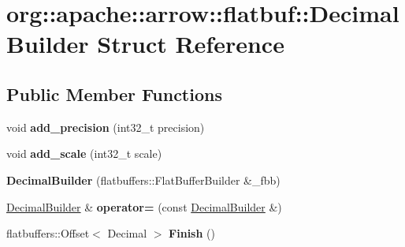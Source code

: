\hypertarget{structorg_1_1apache_1_1arrow_1_1flatbuf_1_1DecimalBuilder}{}\section{org\+:\+:apache\+:\+:arrow\+:\+:flatbuf\+:\+:Decimal\+Builder Struct Reference}
\label{structorg_1_1apache_1_1arrow_1_1flatbuf_1_1DecimalBuilder}
\subsection*{Public Member Functions}
\begin{DoxyCompactItemize}
\item 
void {\bfseries add\+\_\+precision} (int32\+\_\+t precision)\hypertarget{structorg_1_1apache_1_1arrow_1_1flatbuf_1_1DecimalBuilder_ad18a998f2ad83ed23802986b1494d75b}{}\label{structorg_1_1apache_1_1arrow_1_1flatbuf_1_1DecimalBuilder_ad18a998f2ad83ed23802986b1494d75b}

\item 
void {\bfseries add\+\_\+scale} (int32\+\_\+t scale)\hypertarget{structorg_1_1apache_1_1arrow_1_1flatbuf_1_1DecimalBuilder_a7313ee1fe8676a7566858379f7ffdded}{}\label{structorg_1_1apache_1_1arrow_1_1flatbuf_1_1DecimalBuilder_a7313ee1fe8676a7566858379f7ffdded}

\item 
{\bfseries Decimal\+Builder} (flatbuffers\+::\+Flat\+Buffer\+Builder \&\+\_\+fbb)\hypertarget{structorg_1_1apache_1_1arrow_1_1flatbuf_1_1DecimalBuilder_a2cb88cb3ab9f371b3d2c8a614728d732}{}\label{structorg_1_1apache_1_1arrow_1_1flatbuf_1_1DecimalBuilder_a2cb88cb3ab9f371b3d2c8a614728d732}

\item 
\hyperlink{structorg_1_1apache_1_1arrow_1_1flatbuf_1_1DecimalBuilder}{Decimal\+Builder} \& {\bfseries operator=} (const \hyperlink{structorg_1_1apache_1_1arrow_1_1flatbuf_1_1DecimalBuilder}{Decimal\+Builder} \&)\hypertarget{structorg_1_1apache_1_1arrow_1_1flatbuf_1_1DecimalBuilder_aafab4c6385cffcef543c4bfce5ff8273}{}\label{structorg_1_1apache_1_1arrow_1_1flatbuf_1_1DecimalBuilder_aafab4c6385cffcef543c4bfce5ff8273}

\item 
flatbuffers\+::\+Offset$<$ Decimal $>$ {\bfseries Finish} ()\hypertarget{structorg_1_1apache_1_1arrow_1_1flatbuf_1_1DecimalBuilder_a7d2808441123bd1c90297daa21e96723}{}\label{structorg_1_1apache_1_1arrow_1_1flatbuf_1_1DecimalBuilder_a7d2808441123bd1c90297daa21e96723}

\end{DoxyCompactItemize}
